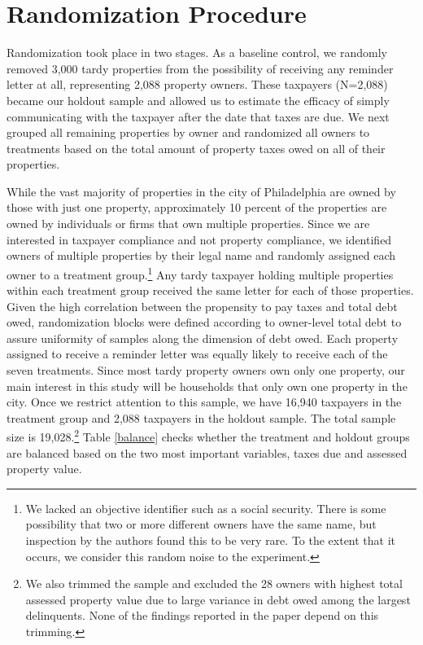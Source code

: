 \documentclass[12pt]{article}
\begin{document}
  
\section{Randomization Procedure}

Randomization took place in two stages.  As a baseline control, we
randomly removed 3,000 tardy properties from the possibility of
receiving any reminder letter at all, representing 2,088 property owners.  These taxpayers (N=2,088)
became our holdout sample and allowed us to estimate the efficacy of
simply communicating with the taxpayer after the date that taxes are
due. We next grouped all remaining properties by owner and randomized all owners to treatments based on the total amount of
property taxes owed on all of their properties. 

While the vast majority of properties in the city of Philadelphia are
owned by those with just one property, approximately 10 percent of the properties are
owned by individuals or firms that own multiple properties. Since we
are interested in taxpayer compliance and not property compliance, we
identified owners of multiple properties by their legal
name and randomly assigned each owner to a treatment
group.\footnote{We lacked an objective identifier such as a social
  security.  There is some possibility that two or more different
  owners have the same name, but inspection by the authors found this
  to be very rare.  To the extent that it occurs, we consider this
  random noise to the experiment.} Any tardy taxpayer holding
multiple properties within each treatment group received the same
letter for each of those properties.  Given the high correlation
between the propensity to pay taxes and total debt owed, randomization
blocks were defined according to owner-level total debt to assure
uniformity of samples along the dimension of debt owed. Each property
assigned to receive a reminder letter was equally likely to receive
each of the seven treatments. Since most tardy property owners own only one property, our main
interest in this study will be households that only
own one property in the city. Once we restrict attention to this
sample, we have 16,940 taxpayers in the treatment group and 2,088
taxpayers in the holdout sample.  The total sample size is
19,028.\footnote{We also trimmed the sample and excluded the 28 owners
  with highest total assessed property value due to large variance in debt 
  owed among the largest delinquents. None of the findings
  reported in the paper depend on this trimming.}  Table \ref{balance}
checks whether the treatment and holdout groups are balanced based on
the two most important variables, taxes due and assessed property
value.
\end{document}
